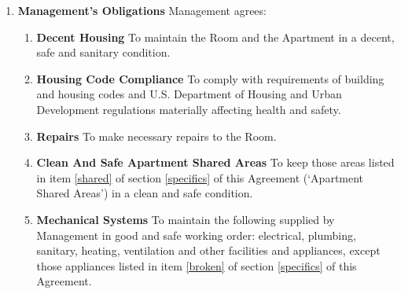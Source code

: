 \documentclass[12pt,letterpaper]{article}
\newcommand{\management}{Management}
\newcommand{\condo}{Wilson Manor}
\newcommand{\apt}{Apartment}
\newcommand{\room}{Room}
\newcommand{\shared}{Apartment Shared Areas}
\newcommand{\lodger}{Lodger}
\begin{document}
\begin{enumerate}
\begin{enumerate}
			\item \textbf{Rubbish Removal} \quad To dispose of all ashes, garbage, rubbish and other waste from the \room{} in a sanitary and safe manner in the receptacles and trash bins provided by \management{} or owned by \lodger{}. 
			\item \textbf{Care In Use Of Facilities} \quad To use only in a reasonable and safe manner all electrical, plumbing, sanitary, heating, ventilating, air-conditioning and other facilities and appurtenances. 
			\item \textbf{Damage To \room{}, \apt{}, Or \condo{}} \quad No \lodger{}, or guest, or other person under their control shall deface, paint, damage, destroy, tamper with or remove any part of the \room{}, \apt{}, Or \condo{}.
			\item \textbf{Alterations} \quad To make no repairs, alterations or additions of any kind without the prior written consent of \management{}, including but not limited to, painting, changing locks, or installing security bars, doors or safety devices. \management{} may withhold such consent at \management{}'s sole discretion. 
			\item \textbf{Signs} \quad Not to display on or about the \room{}, \apt{}, or \condo{} any signs or advertisements of any kind including, but not limited to, signs for goods or services. 
		\end{enumerate}
	\item \textbf{Management's Obligations} \quad
		\management{} agrees: 
		\begin{enumerate}
			\item \textbf{Decent Housing} \quad To maintain the \room{} and the \apt{} in a decent, safe and sanitary condition. 
			\item \textbf{Housing Code Compliance} \quad To comply with requirements of building and housing codes and U.S. Department of Housing and Urban Development regulations materially affecting health and safety. 
			\item \textbf{Repairs} \quad To make necessary repairs to the \room{}. 
			\item \textbf{Clean And Safe \shared{}} \quad To keep those areas listed in item \ref{shared} of section \ref{specifics} of this Agreement (`\shared{}') in a clean and safe condition. 
			\item \textbf{Mechanical Systems} \quad To maintain the following supplied by \management{} in good and safe working order: electrical, plumbing, sanitary, heating, ventilation and other facilities and appliances, except those appliances listed in item \ref{broken} of section \ref{specifics} of this Agreement. 

\end{enumerate}
\end{enumerate}
\end{document}
